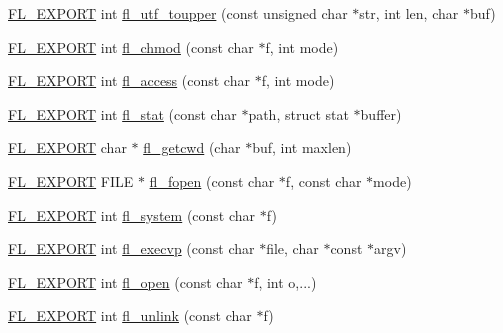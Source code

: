 \begin{DoxyCompactItemize}
\item 
\hyperlink{_fl___export_8_h_aa9ba29a18aee9d738370a06eeb4470fc}{F\+L\+\_\+\+E\+X\+P\+O\+RT} int \hyperlink{group__fl__unicode_gad93d85e990d7d839bddc07503ea08f3d}{fl\+\_\+utf\+\_\+toupper} (const unsigned char $\ast$str, int len, char $\ast$buf)
\item 
\hyperlink{_fl___export_8_h_aa9ba29a18aee9d738370a06eeb4470fc}{F\+L\+\_\+\+E\+X\+P\+O\+RT} int \hyperlink{group__fl__unicode_ga12c91f94c4c0fb9e92311ecacfdfe062}{fl\+\_\+chmod} (const char $\ast$f, int mode)
\item 
\hyperlink{_fl___export_8_h_aa9ba29a18aee9d738370a06eeb4470fc}{F\+L\+\_\+\+E\+X\+P\+O\+RT} int \hyperlink{group__fl__unicode_ga70c2ee45d564110f36f940826990ea85}{fl\+\_\+access} (const char $\ast$f, int mode)
\item 
\hyperlink{_fl___export_8_h_aa9ba29a18aee9d738370a06eeb4470fc}{F\+L\+\_\+\+E\+X\+P\+O\+RT} int \hyperlink{group__fl__unicode_ga3cfc4d7871df92727d19904a7f245a1a}{fl\+\_\+stat} (const char $\ast$path, struct stat $\ast$buffer)
\item 
\hyperlink{_fl___export_8_h_aa9ba29a18aee9d738370a06eeb4470fc}{F\+L\+\_\+\+E\+X\+P\+O\+RT} char $\ast$ \hyperlink{group__fl__unicode_ga8b06154b3fac29691446b912e721d11e}{fl\+\_\+getcwd} (char $\ast$buf, int maxlen)
\item 
\hyperlink{_fl___export_8_h_aa9ba29a18aee9d738370a06eeb4470fc}{F\+L\+\_\+\+E\+X\+P\+O\+RT} F\+I\+LE $\ast$ \hyperlink{group__fl__unicode_gab798a9fb10c29ebe56f292b4cc8e8022}{fl\+\_\+fopen} (const char $\ast$f, const char $\ast$mode)
\item 
\hyperlink{_fl___export_8_h_aa9ba29a18aee9d738370a06eeb4470fc}{F\+L\+\_\+\+E\+X\+P\+O\+RT} int \hyperlink{group__fl__unicode_gad1cf63789d42b9877354a0bb70119ef2}{fl\+\_\+system} (const char $\ast$f)
\item 
\hyperlink{_fl___export_8_h_aa9ba29a18aee9d738370a06eeb4470fc}{F\+L\+\_\+\+E\+X\+P\+O\+RT} int \hyperlink{group__fl__unicode_gaebe70bd43e701d1059728f7f87cc4eba}{fl\+\_\+execvp} (const char $\ast$file, char $\ast$const $\ast$argv)
\item 
\hyperlink{_fl___export_8_h_aa9ba29a18aee9d738370a06eeb4470fc}{F\+L\+\_\+\+E\+X\+P\+O\+RT} int \hyperlink{group__fl__unicode_ga2e60bfbced4b10ac703ad6817b59398b}{fl\+\_\+open} (const char $\ast$f, int o,...)
\item 
\hyperlink{_fl___export_8_h_aa9ba29a18aee9d738370a06eeb4470fc}{F\+L\+\_\+\+E\+X\+P\+O\+RT} int \hyperlink{group__fl__unicode_gaf54c77e862551f83700f59e095a17cce}{fl\+\_\+unlink} (const char $\ast$f)

\end{DoxyCompactItemize}
